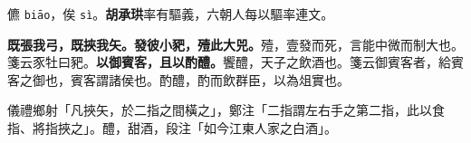 \begin{quoting}儦 \texttt{biāo}，俟 \texttt{sì}。\textbf{胡承珙}率有驅義，六朝人每以驅率連文。\end{quoting}

\textbf{既張我弓，既挾我矢。發彼小豝，殪此大兕。}{\footnotesize 殪，壹發而死，言能中微而制大也。箋云豕牡曰豝。}\textbf{以御賓客，且以酌醴。}{\footnotesize 饗醴，天子之飲酒也。箋云御賓客者，給賓客之御也，賓客謂諸侯也。酌醴，酌而飲群臣，以為俎實也。}

\begin{quoting}儀禮鄉射「凡挾矢，於二指之間橫之」，鄭注「二指謂左右手之第二指，此以食指、將指挾之」。醴，甜酒，段注「如今江東人家之白酒」。\end{quoting}

